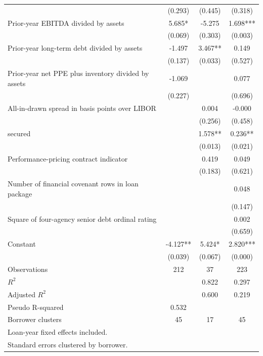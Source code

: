 {\begin{tabular}{l*{3}{c}}
                    &     (0.293)   &     (0.445)   &     (0.318)   \\
Prior-year EBITDA divided by assets&       5.685*  &      -5.275   &       1.698***\\
                    &     (0.069)   &     (0.303)   &     (0.003)   \\
Prior-year long-term debt divided by assets&      -1.497   &       3.467** &       0.149   \\
                    &     (0.137)   &     (0.033)   &     (0.527)   \\
Prior-year net PPE plus inventory divided by assets&      -1.069   &               &       0.077   \\
                    &     (0.227)   &               &     (0.696)   \\
All-in-drawn spread in basis points over LIBOR&               &       0.004   &      -0.000   \\
                    &               &     (0.256)   &     (0.458)   \\
secured             &               &       1.578** &       0.236** \\
                    &               &     (0.013)   &     (0.021)   \\
Performance-pricing contract indicator&               &       0.419   &       0.049   \\
                    &               &     (0.183)   &     (0.621)   \\
Number of financial covenant rows in loan package&               &               &       0.048   \\
                    &               &               &     (0.147)   \\
Square of four-agency senior debt ordinal rating&               &               &       0.002   \\
                    &               &               &     (0.659)   \\
Constant            &      -4.127** &       5.424*  &       2.820***\\
                    &     (0.039)   &     (0.067)   &     (0.000)   \\
\hline
Observations        &         212   &          37   &         223   \\
\(R^{2}\)           &               &       0.822   &       0.297   \\
Adjusted \(R^{2}\)  &               &       0.600   &       0.219   \\
Pseudo R-squared    &       0.532   &               &               \\
Borrower clusters   &          45   &          17   &          45   \\
\hline\hline
\multicolumn{4}{l}{\footnotesize Loan-year fixed effects included.}\\
\multicolumn{4}{l}{\footnotesize Standard errors clustered by borrower.}\\
\end{tabular}
}
